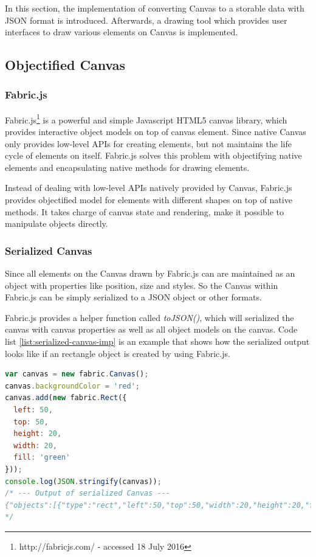 In this section, the implementation of converting Canvas to a storable data with JSON format is introduced. Afterwards, a drawing tool which provides user interfaces to draw various elements on Canvas is implemented.

\subsection{Objectified Canvas}

\subsubsection{Fabric.js}
Fabric.js\footnote{http://fabricjs.com/ - accessed 18 July 2016} is a powerful and simple Javascript HTML5 canvas library, which provides interactive object models on top of canvas element. Since native Canvas only provides low-level APIs for creating elements, but not maintains the life cycle of elements on itself. Fabric.js solves this problem with objectifying native elements and encapsulating native methods for drawing elements. 

Instead of dealing with low-level APIs natively provided by Canvas, Fabric.js provides objectified model for elements with different shapes  on top of native methods. It takes charge of canvas state and rendering, make it possible to manipulate objects directly.


\subsubsection{Serialized Canvas}
Since all elements on the Canvas drawn by Fabric.js can are maintained as an object with properties like position, size and styles.
So the Canvas within Fabric.js can be simply serialized to a JSON object or other formats. 

Fabric.js provides a helper function called \textit{toJSON()}, which will serialized the canvas with canvas properties as well as all object models on the canvas. Code list \ref{list:serialized-canvas-imp} is an example that shows how the serialized output looks like if an rectangle object is created by using Fabric.js.

\begin{lstlisting}[language=JavaScript, caption=Serialized Canvas by Fabric.js , label={list:serialized-canvas-imp}]
var canvas = new fabric.Canvas();
canvas.backgroundColor = 'red';
canvas.add(new fabric.Rect({
  left: 50,
  top: 50,
  height: 20,
  width: 20,
  fill: 'green'
}));
console.log(JSON.stringify(canvas));
/* --- Output of serialized Canvas --- 
{"objects":[{"type":"rect","left":50,"top":50,"width":20,"height":20,"fill":"green","overlayFill":null,"stroke":null,"strokeWidth":1,"strokeDashArray":null,"scaleX":1,"scaleY":1,"angle":0,"flipX":false,"flipY":false,"opacity":1,"selectable":true,"hasControls":true,"hasBorders":true,"hasRotatingPoint":false,"transparentCorners":true,"perPixelTargetFind":false,"rx":0,"ry":0}],"background":"rgba(0, 0, 0, 0)"}
*/
\end{lstlisting}

